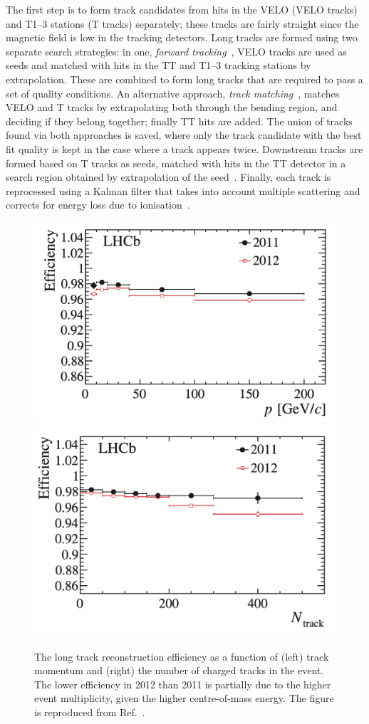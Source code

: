 The first step is to form track candidates from hits in the VELO (VELO tracks) and T1--3 stations (T tracks) separately; these tracks are fairly straight since the magnetic field is low in the tracking detectors. Long tracks are formed using two separate search strategies: in one, \emph{forward tracking}~\cite{VELO-Forward}, VELO tracks are used as seeds and matched with hits in the TT and T1--3 tracking stations by extrapolation. These are combined to form long tracks that are required to pass a set of quality conditions. An alternative approach, \emph{track matching}~\cite{VELO-Match,VELO-Match2}, matches VELO and T tracks by extrapolating both through the bending region, and deciding if they belong together; finally TT hits are added. The union of tracks found via both approaches is saved, where only the track candidate with the best fit quality is kept in the case where a track appears twice. Downstream tracks are formed based on T tracks as seeds, matched with hits in the TT detector in a search region obtained by extrapolation of the seed~\cite{Downstream}. Finally, each track is reprocessed using a Kalman filter that takes into account multiple scattering and corrects for energy loss due to ionisation~\cite{fruhwirthApplicationKalmanFiltering1987,VanTilburg:885750}.

\begin{figure}[tb]
    \centering
    \includegraphics[width=0.45\columnwidth]{figures/detector/track_eff_p.png}
    \includegraphics[width=0.45\columnwidth]{figures/detector/track_eff_N.png}
    \caption{The long track reconstruction efficiency as a function of (left) track momentum and (right) the number of charged tracks in the event. The lower efficiency in 2012 than 2011 is partially due to the higher event multiplicity, given the higher centre-of-mass energy. The figure is reproduced from Ref.~\cite{LHCb-Performance}.}
    \label{fig:track_eff}
\end{figure}

